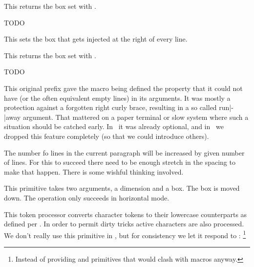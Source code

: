 \startnewprimitive[title={\prm {localmiddleboxbox}}]

This returns the box set with .

\stopnewprimitive

\startnewprimitive[title={\prm {localpretolerance}}]
    TODO
\stopnewprimitive

\startnewprimitive[title={\prm {localrightbox}}]

This sets the box that gets injected at the right of every line.

\stopnewprimitive

\startnewprimitive[title={\prm {localrightboxbox}}]

This returns the box set with .

\stopnewprimitive

\startnewprimitive[title={\prm {localtolerance}}]
    TODO
\stopnewprimitive

\startoldprimitive[title={\prm {long}}][obsolete=yes]

This original prefix gave the macro being defined the property that it could not
have  (or the often equivalent empty lines) in its arguments. It was
mostly a protection against a forgotten right curly brace, resulting in a so called
run|-|away argument. That mattered on a paper terminal or slow system where such a
situation should be catched early. In \LUATEX\ it was already optional, and in
\LUAMETATEX\ we dropped this feature completely (so that we could introduce others).

\stopoldprimitive

\startoldprimitive[title={\prm {looseness}}]

The number fo lines in the current paragraph will be increased by given number of
lines. For this to succeed there need to be enough stretch in the spacing to make
that happen. There is some wishful thinking involved.

\stopoldprimitive

\startoldprimitive[title={\prm {lower}}]

This primitive takes two arguments, a dimension and a box. The box is moved down.
The operation only succeeds in horizontal mode.

\stopoldprimitive

\startoldprimitive[title={\prm {lowercase}}]

This token processor converts character tokens to their lowercase counterparts as
defined per . In order to permit dirty tricks active characters are
also processed. We don't really use this primitive in \CONTEXT, but for
consistency we let it respond to : \footnote {Instead of providing
\type {\lowercased} and \type {\uppercased} primitives that would clash with
macros anyway.}


